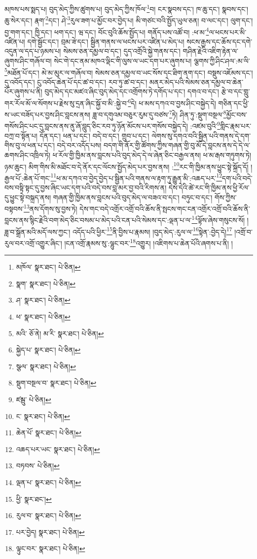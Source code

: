 མཁས་པས་སྨད་པ། བུད་མེད་ཀྱིས་ཚུགས་པ། བུད་མེད་ཀྱིས་ཁོལ་\footnote{མཁོལ་  སྣར་ཐང་།  པེ་ཅིན། }བ། ངར་སྣབས་དང་། ཁ་ཆུ་དང་། སྣབས་དང་། ཆུ་སེར་དང་། རྣག་\footnote{སྣག་  སྣར་ཐང་།  པེ་ཅིན། }དང་། ཤེ་\footnote{ཤ་  སྣར་ཐང་།  པེ་ཅིན། }རུལ་ཟག་པ་མྱོང་བར་བྱེད་པ། མི་གཙང་བའི་སྤྱོད་ཡུལ་ཅན། བ་ལང་དང་། ལུག་དང་། བྱ་གག་དང་། ཁྱི་དང་། ཕག་དང་། ཝ་དང་། བོང་བུའི་ཆོས་སྤྱོད་པ། གནོད་པས་འཚོ་བ། :ཕ་མ་\footnote{ཕ་  སྣར་ཐང་།  པེ་ཅིན། }ལ་ཕངས་པར་མི་འཛིན་པ། དགེ་སྦྱོང་དང་། བྲམ་ཟེ་དང་། སྦྱིན་གནས་ལ་ཕངས་པར་འཛིན་པ་མེད་པ། སངས་རྒྱས་དང་ཆོས་དང་དགེ་འདུན་ལ་དད་པ་ཉམས་པ། སེམས་ཅན་དམྱལ་བ་དང་། དུད་འགྲོའི་སྐྱེ་གནས་དང་། གཤིན་རྗེའི་འཇིག་རྟེན་ལ་ཞུགས་ཤིང་གཞོལ་བ། སེང་གེ་དང་ནམ་མཁའ་ལྡིང་གི་ལུས་ལ་ཡང་དག་པར་ཞུགས་པ། ལྕགས་ཀྱི་ཤིང་ཤལ་:མ་ལི་\footnote{མའི་  ཅོ་ནེ། མ་རི་  སྣར་ཐང་།  པེ་ཅིན། }མཐོན་པོ་དང་། མེ་མ་མུར་ལ་གཞོལ་བ། སེམས་ཅན་དམྱལ་བ་ཡང་སོས་དང་ཐིག་ནག་དང་། བསྡུས་འཇོམས་དང་། དུ་འབོད་དང་། ངུ་འབོད་ཆེན་པོ་དང་ཚ་བ་དང་། རབ་ཏུ་ཚ་བ་དང་། མནར་མེད་པའི་སེམས་ཅན་དམྱལ་བ་ཆེན་པོར་ཞུགས་པ་ནི། བུད་མེད་དང་མཛའ་ཞིང་བུད་མེད་དང་འགྲོགས་ཏེ་དགོད་པ་དང་། དགའ་བ་དང་། རྩེ་བ་དང་གླུ་གར་རོལ་མོ་ལ་སོགས་པ་རྗེས་སུ་དྲན་ཞིང་སྐྱོ་བ་མི་:སྐྱེ་བ་\footnote{སྐྱེད་པ་  སྣར་ཐང་།  པེ་ཅིན། }དེ། ཕ་མས་དཀའ་བ་བྱས་ཤིང་བསྐྱེད་དེ། གཅིན་དང་ཕྱི་ས་ཡང་བཟོད་པར་བྱས་ཤིང་བླངས་ནས། ཟླ་བ་དགུའམ་བཅུར་རུམ་དུ་བཙས་\footnote{སྩལ་  སྣར་ཐང་།  པེ་ཅིན། }ཏེ། ཤིན་ཏུ་:སྡུག་བསྔལ་\footnote{སྡུག་བསྔལ་བ་  སྣར་ཐང་།  པེ་ཅིན། }མྱོང་བས་གསོས་ཤིང་པང་དུ་བླངས་ནས་ནུ་ཞོ་བླུད་ཅིང་རབ་ཏུ་ཉོན་མོངས་པར་གསོས་བསྐྱེད་དེ། :འཛམ་བུའི་\footnote{ཛམྦུ་  པེ་ཅིན། }གླིང་རྣམ་པར་བཀྲ་བ་སྟོན་པ། དོན་དང་། ཕན་པ་དང་། བདེ་བ་དང་། གྲུབ་པ་དང་། ལེགས་སུ་དགའ་བའི་སྦྱིན་པའི་གནས་དེ་དག་གིས་བུ་ལ་ཕན་པ་དང་། བདེ་བར་འདོད་པས། བདག་གི་ནོར་གྱི་ཚོགས་ཀྱིས་གཞན་གྱི་བུ་མོ་དེ་བླངས་ནས་དེ་དེ་ལ་ཆགས་ཤིང་འཁྲིལ་ཏེ། ཕ་རོལ་གྱི་ཁྱིམ་ནས་བླངས་པའི་བུད་མེད་དེ་ལ་ཞེན་ཅིང་བརྒྱལ་ནས། ཕ་མ་རྒས་གཏུགས་ཏེ། ཉམ་ཆུང་། མིག་གིས་མི་མཐོང་བ་དེ་ནོར་དང་ལོངས་སྤྱོད་མེད་པར་བྱས་ནས། :\footnote{ང་  སྣར་ཐང་།  པེ་ཅིན། }རང་གི་ཁྱིམ་ནས་ཕྱུང་སྟེ་སྐྲོད་དོ། །རྒྱལ་པོ་:ཆེན་པོ་གང་\footnote{ཆེན་པོ་  སྣར་ཐང་།  པེ་ཅིན། }ཕ་མ་དཀའ་བ་བྱེད་བྱེད་པ་སྦྱིན་པའི་གནས་ལ་རྟག་ཏུ་རྒྱུན་མི་:འཆད་པར་\footnote{འཆད་པར་ཡང་  སྣར་ཐང་།  པེ་ཅིན། }དག་པའི་བདེ་བས་བསྟི་སྟང་དུ་བྱས་ཞིང་ཡང་དག་པའི་བདེ་བས་བླ་མར་བྱ་བའི་རིགས་ན། དེས་དེའི་ཚེ་རང་གི་ཁྱིམ་ནས་ཕྱི་རོལ་དུ་ཕྱུང་སྟེ་བསྐྲད་ནས། གཞན་གྱི་ཁྱིམ་ནས་བླངས་པའི་བུད་མེད་ལ་བཟའ་བ་དང་། བཏུང་བ་དང་། གོས་ཀྱིས་བསྟབས་\footnote{བཏབས་  པེ་ཅིན། }ནས་དོགས་སུ་བྱས་ཏེ། དེས་གང་བདེ་འགྲོར་འགྲོ་བའི་ཆོས་ནི་སྤངས་གང་ངན་འགྲོར་འགྲོ་བའི་ཆོས་ནི་བླངས་ནས་སྙིང་རྗེའི་བག་མེད་ཅིང་བསམ་པ་མེད་པའི་ངན་པའི་སེམས་དང་:ལྡན་པ་ལ་\footnote{ལྡན་པ་  སྣར་ཐང་།  པེ་ཅིན། }ལྟོས་ཞེས་གསུངས་སོ། །ཟླ་བ་སྒྲོན་མའི་མདོ་ལས་ཀྱང་། འདོད་པའི་ཕྱིར་\footnote{ཕྱི་  སྣར་ཐང་། }ནི་བྱིས་པ་རྣམས། །བུད་མེད་:རུལ་ལ་\footnote{རུལ་བ་  སྣར་ཐང་།  པེ་ཅིན། }སྟེན་:བྱེད་དེ།\footnote{པར་བྱེད།  སྣར་ཐང་།  པེ་ཅིན། } །འགྲོ་བ་རུལ་བར་འགྲོ་འགྱུར་ཞིང་། །ངན་འགྲོ་རྣམས་སུ་:ལྷུང་བར་\footnote{ལྟུང་བར་  སྣར་ཐང་།  པེ་ཅིན། }འགྱུར། །འཇིགས་པ་ཆེན་པོའི་ཞགས་པ་ནི། །

